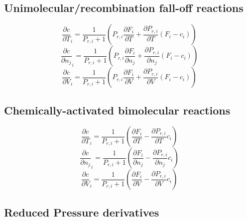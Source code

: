 \documentclass[a4paper,10pt]{article}
\begin{document}
\subsection{Unimolecular/recombination fall-off reactions}
\begin{dmath} \frac{\partial c }{\partial T }_{i} = \frac{1}{P_{r, i} + 1} \left(P_{r, i} \frac{\partial F_{i} }{\partial T } + \frac{\partial P_{r, i} }{\partial T } \left(F_{i} - c_{i}\right)\right)\end{dmath} 
\begin{dmath} \frac{\partial c }{\partial {n_j} }_{i} = \frac{1}{P_{r, i} + 1} \left(P_{r, i} \frac{\partial F_{i} }{\partial {n_j} } + \frac{\partial P_{r, i} }{\partial {n_j} } \left(F_{i} - c_{i}\right)\right)\end{dmath} 
\begin{dmath} \frac{\partial c }{\partial V }_{i} = \frac{1}{P_{r, i} + 1} \left(P_{r, i} \frac{\partial F_{i} }{\partial V } + \frac{\partial P_{r, i} }{\partial V } \left(F_{i} - c_{i}\right)\right)\end{dmath} 
\subsection{Chemically-activated bimolecular reactions}
\begin{dmath} \frac{\partial c }{\partial T }_{i} = \frac{1}{P_{r, i} + 1} \left(\frac{\partial F_{i} }{\partial T } - \frac{\partial P_{r, i} }{\partial T } c_{i}\right)\end{dmath} 
\begin{dmath} \frac{\partial c }{\partial {n_j} }_{i} = \frac{1}{P_{r, i} + 1} \left(\frac{\partial F_{i} }{\partial {n_j} } - \frac{\partial P_{r, i} }{\partial {n_j} } c_{i}\right)\end{dmath} 
\begin{dmath} \frac{\partial c }{\partial V }_{i} = \frac{1}{P_{r, i} + 1} \left(\frac{\partial F_{i} }{\partial V } - \frac{\partial P_{r, i} }{\partial V } c_{i}\right)\end{dmath} 
\subsection{Reduced Pressure derivatives}
\end{document}
